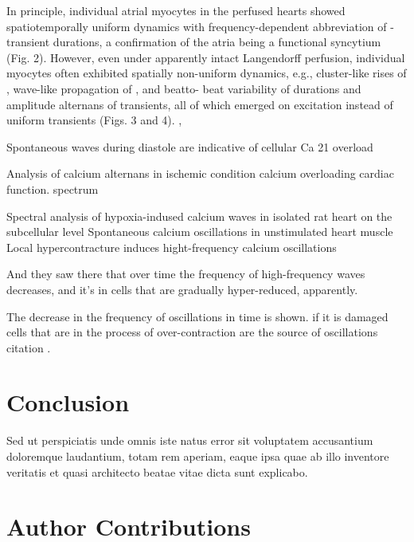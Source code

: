 \documentclass{biophys-new}
\begin{document}
\fi

In principle, individual atrial myocytes in the perfused
hearts showed spatiotemporally uniform  dynamics
with frequency-dependent abbreviation of -transient
durations, a confirmation of the atria being a functional
syncytium (Fig. 2). However, even under apparently intact
Langendorff perfusion, individual myocytes often exhibited
spatially non-uniform  dynamics, e.g., cluster-like
rises of , wave-like propagation of , and beatto-
beat variability of durations and amplitude alternans of
 transients, all of which emerged on excitation instead
of uniform  transients (Figs. 3 and 4). \cite{jiang2014pacing}, \cite{aguirre2014intravital}

Spontaneous  waves during diastole are indicative of cellular Ca 21 overload \cite{macquaide2007measurement}


Analysis of calcium alternans in ischemic condition
calcium overloading
cardiac function.
spectrum

Spectral analysis of hypoxia-indused calcium waves in isolated rat heart on the subcellular level
Spontaneous calcium oscillations in unstimulated heart muscle
Local hypercontracture induces hight-frequency calcium oscillations

And they saw there that over time the frequency of high-frequency waves decreases, and it’s in cells that are gradually hyper-reduced, apparently.

The decrease in the frequency of oscillations in time is shown.
if it is damaged cells that are in the process of over-contraction
are the source of oscillations
\cite{sato2014depolarization}
citation \cite{sato2014depolarization}.

\section*{Conclusion}

Sed ut perspiciatis unde omnis iste natus error sit voluptatem accusantium doloremque laudantium, totam rem aperiam, eaque ipsa quae ab illo inventore veritatis et quasi architecto beatae vitae dicta sunt explicabo.

\section*{Author Contributions}
\end{document}

